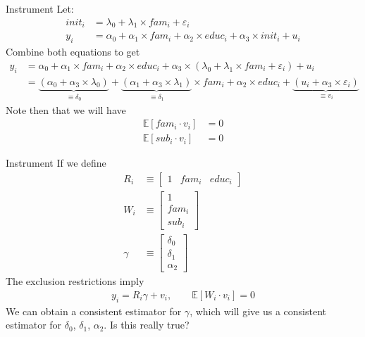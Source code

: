 \begin{frame}{Instrument}
    Let:
    \begin{align*}
        init_i &= \lambda_0 + \lambda_1 \times fam_i + \varepsilon_i
        \\
        y_i &= \alpha_0 + \alpha_1 \times fam_i + \alpha_2 \times educ_i + \alpha_3 \times init_i + u_i
    \end{align*}
    Combine both equations to get
    \begin{align*}
        y_i &= \alpha_0 + \alpha_1 \times fam_i + \alpha_2 \times educ_i + \alpha_3 \times (\lambda_0 + \lambda_1 \times fam_i + \varepsilon_i) + u_i
        \\
        &= \underbrace{(\alpha_0 + \alpha_3 \times \lambda_0)}_{\equiv \delta_0} + \underbrace{(\alpha_1 + \alpha_3 \times \lambda_1)}_{\equiv \delta_1} \times fam_i + \alpha_2 \times educ_i + \underbrace{(u_i + \alpha_3 \times \varepsilon_i)}_{\equiv v_i}
    \end{align*}
    Note then that we will have
    \begin{align*}
        \mathbb{E}[fam_i \cdot v_i] &= 0
        \\
        \mathbb{E}[sub_i \cdot v_i] &= 0
    \end{align*}
\end{frame}

\begin{frame}{Instrument}
    If we define
    \begin{align*}
        R_i &\equiv \begin{bmatrix} 1 & fam_i & educ_i \end{bmatrix}
        \\
        W_i &\equiv \begin{bmatrix}
                    1 \\
                    fam_i \\
                    sub_i
                    \end{bmatrix}
        \\
        \gamma &\equiv \begin{bmatrix}
                         \delta_0 \\
                         \delta_1 \\
                         \alpha_2
                        \end{bmatrix}
    \end{align*}
    The exclusion restrictions imply
    \begin{align*}
        y_i = R_i \gamma + v_i, \qquad \mathbb{E}[W_i \cdot v_i] = 0
    \end{align*}
    We can obtain a consistent estimator for $\gamma$, which will give us a consistent estimator for $\delta_0$, $\delta_1$, $\alpha_2$. Is this really true?
\end{frame}

